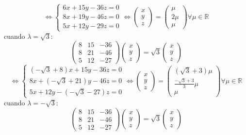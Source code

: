 \documentclass{article}
\begin{document}
$$
\Leftrightarrow \left\{ \begin{array}{c}
     6x+15y-36z =0  \\
     8x+19y-46z =0  \\
     5x+12y-29z =0
\end{array} \right.
\Leftrightarrow \left( \begin{array}{c}
      x \\
      y \\
      z
\end{array} \right) =
\left( \begin{array}{c}
      \mu \\
      2\mu \\
      \mu
\end{array} \right) \forall \mu \in \mathbb{R}
$$
cuando $\lambda=\sqrt{3}$:
$$
\left( \begin{array}{ccc}
    8 & 15 & -36\\
    8 & 21 & -46\\
    5 & 12 & -27
\end{array} \right)
\left( \begin{array}{c}
      x \\
      y \\
      z
\end{array} \right) = \sqrt{3}
\left( \begin{array}{c}
      x \\
      y \\
      z
\end{array} \right)
$$
$$
\Leftrightarrow \left\{ \begin{array}{c}
     (-\sqrt{3}+8)x+15y-36z =0  \\
     8x+(-\sqrt{3}+21)y-46z =0  \\
     5x+12y-(-\sqrt{3}-27)z =0
\end{array} \right.
\Leftrightarrow \left( \begin{array}{c}
      x \\
      y \\
      z
\end{array} \right) =
\left( \begin{array}{c}
      (\sqrt{3}+3)\mu \\
      \frac{-\sqrt{3}+3}{3}\mu \\
      \mu
\end{array} \right) \forall \mu \in \mathbb{R}
$$
cuando $\lambda=-\sqrt{3}$:
$$
\left( \begin{array}{ccc}
    8 & 15 & -36\\
    8 & 21 & -46\\
    5 & 12 & -27
\end{array} \right)
\left( \begin{array}{c}
      x \\
      y \\
      z
\end{array} \right) = \sqrt{3}
\left( \begin{array}{c}
      x \\
      y \\
      z
\end{array} \right)
$$
\end{document}
